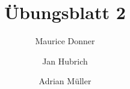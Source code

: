 \documentclass{article}
\title{\textsf{\color{blue!40!black}Übungsblatt 2}}
\author{Maurice Donner \and Jan Hubrich \and Adrian Müller}
\begin{document}
\maketitle
\newpage

\section{}
\end{document}
